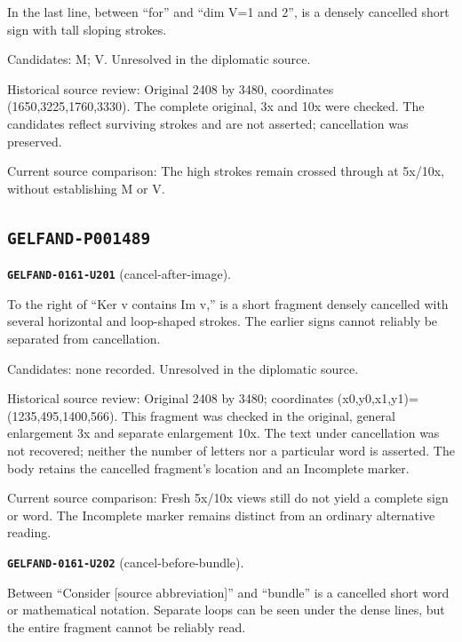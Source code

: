 In the last line, between “for” and “dim V=1 and 2”, is a densely cancelled short sign with tall sloping strokes.\par
Candidates: M; V. Unresolved in the diplomatic source.\par
Historical source review: Original 2408 by 3480, coordinates (1650,3225,1760,3330). The complete original, 3x and 10x were checked. The candidates reflect surviving strokes and are not asserted; cancellation was preserved.\par
Current source comparison: The high strokes remain crossed through at 5x/10x, without establishing M or V.\par\medskip
\subsection*{\texttt{GELFAND-P001489}}
\par\noindent\leavevmode{}\label{GELFAND-0161-U201}\label{GELFAND-P001489:cancel-after-image}\textbf{\texttt{GELFAND-0161-U201}} (cancel-after-image).\nopagebreak[4]\par
To the right of “Ker v contains Im v,” is a short fragment densely cancelled with several horizontal and loop-shaped strokes. The earlier signs cannot reliably be separated from cancellation.\par
Candidates: none recorded. Unresolved in the diplomatic source.\par
Historical source review: Original 2408 by 3480; coordinates (x0,y0,x1,y1)=(1235,495,1400,566). This fragment was checked in the original, general enlargement 3x and separate enlargement 10x. The text under cancellation was not recovered; neither the number of letters nor a particular word is asserted. The body retains the cancelled fragment’s location and an Incomplete marker.\par
Current source comparison: Fresh 5x/10x views still do not yield a complete sign or word. The Incomplete marker remains distinct from an ordinary alternative reading.\par\medskip
\par\noindent\leavevmode{}\label{GELFAND-0161-U202}\label{GELFAND-P001489:cancel-before-bundle}\textbf{\texttt{GELFAND-0161-U202}} (cancel-before-bundle).\nopagebreak[4]\par
Between “Consider [source abbreviation]” and “bundle” is a cancelled short word or mathematical notation. Separate loops can be seen under the dense lines, but the entire fragment cannot be reliably read.\par
